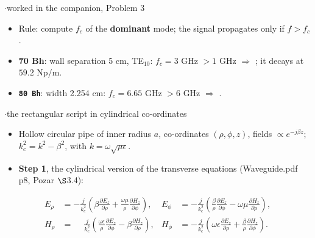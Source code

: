 \par{}
{\color{sub}\footnotesize {} \gap$\cdot$\gap worked in the companion, Problem 3}
\begin{itemize}
  \item Rule: compute $f_c$ of the \textbf{dominant} mode; the signal propagates only if
    $f > f_c$.
  \item \textbf{70 Bh}: wall separation 5 cm, TE$_{10}$: $f_c = 3$ GHz $> 1$ GHz
    $\Rightarrow$ ; it decays at $59.2$ Np/m.
  \item \textbf{\texttt{80 Bh}}: width 2.254 cm: $f_c = 6.65$ GHz $> 6$ GHz $\Rightarrow$
    .
\end{itemize}

\vspace{2pt}


{\color{sub}\footnotesize {}  \gap$\cdot$\gap the rectangular script in cylindrical co-ordinates}

\begin{itemize}
  \item Hollow circular pipe of inner radius $a$, co-ordinates $(\rho, \phi, z)$,
    fields $\propto e^{-j\beta z}$; $k_c^2 = k^2 - \beta^2$, with $k = \omega\sqrt{\mu\epsilon}$.
  \item \textbf{Step 1}, the cylindrical version of the transverse equations
    (Waveguide.pdf p8, Pozar $\S$3.4):
\end{itemize}
\[
\begin{aligned}
E_\rho &= -\frac{j}{k_c^2}\left(\beta\frac{\partial E_z}{\partial\rho} + \frac{\omega\mu}{\rho}\frac{\partial H_z}{\partial\phi}\right), &
E_\phi &= -\frac{j}{k_c^2}\left(\frac{\beta}{\rho}\frac{\partial E_z}{\partial\phi} - \omega\mu\frac{\partial H_z}{\partial\rho}\right), \\
H_\rho &= \phantom{-}\frac{j}{k_c^2}\left(\frac{\omega\epsilon}{\rho}\frac{\partial E_z}{\partial\phi} - \beta\frac{\partial H_z}{\partial\rho}\right), &
H_\phi &= -\frac{j}{k_c^2}\left(\omega\epsilon\frac{\partial E_z}{\partial\rho} + \frac{\beta}{\rho}\frac{\partial H_z}{\partial\phi}\right).
\end{aligned}
\]

